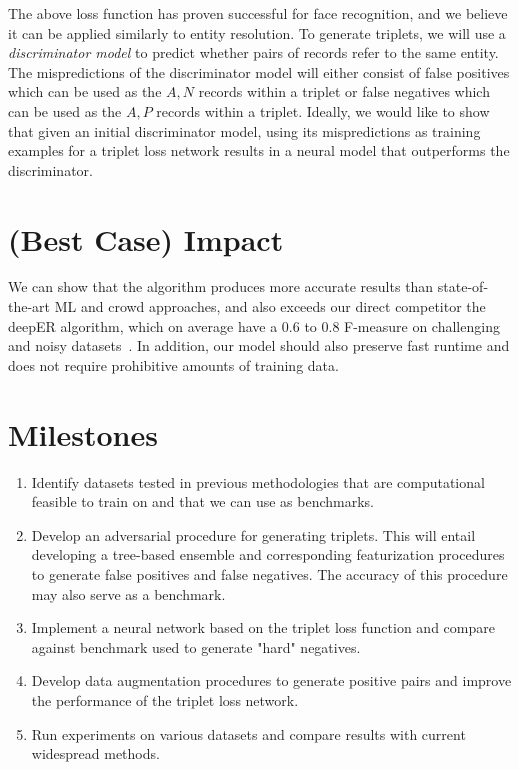 \documentclass{proc}
\begin{document}
The above loss function has proven successful for face recognition, and we believe it can be applied similarly to entity resolution. To generate triplets,  we will use a \emph{discriminator model} to predict whether pairs of records refer to the same entity. The mispredictions of the discriminator model will either consist of false positives which can be used as the $A, N$ records within a triplet or false negatives which can be used as the $A, P$  records within a triplet. Ideally, we would like to show that given an initial discriminator model, using its mispredictions as training examples for a triplet loss network results in a neural model that outperforms the discriminator.

\section{(Best Case) Impact}

We can show that the algorithm produces more accurate results than state-of-the-art ML and crowd approaches, and also exceeds our direct competitor the deepER algorithm, which on average have a 0.6 to 0.8 F-measure on challenging and noisy datasets~\cite{ebraheem2017deeper}. In addition, our model should also preserve fast runtime and does not require prohibitive amounts of training data. 

\section{Milestones}

\begin{enumerate}
  \item Identify datasets tested in previous methodologies that are computational feasible to train on and that we can use as benchmarks.
  \item Develop an adversarial procedure for generating triplets. This will entail developing a tree-based ensemble and corresponding featurization procedures to generate false positives and false negatives. The accuracy of this procedure may also serve as a benchmark.
  \item Implement a neural network based on the triplet loss function and compare against benchmark used to generate "hard" negatives.
  \item Develop data augmentation procedures to generate positive pairs and  improve the performance of the triplet loss network.
  \item Run experiments on various datasets and compare results with current widespread methods.
\end{enumerate}
\end{document}
